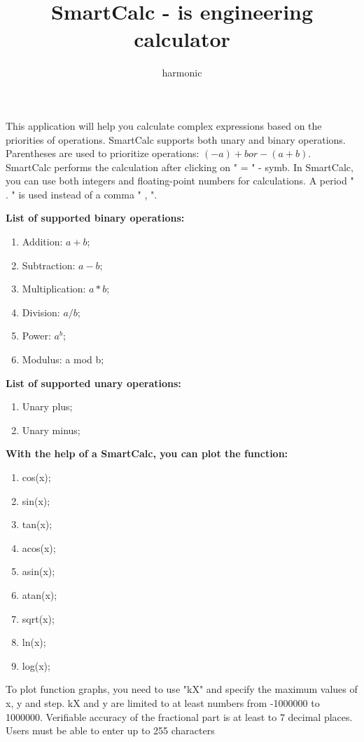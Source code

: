 \documentclass{article}
\title{SmartCalc - is engineering calculator}
\author{harmonic}
\begin{document}
\maketitle
This application will help you calculate complex expressions based on the priorities of operations.
SmartCalc supports both unary and binary operations. Parentheses are used to prioritize operations: $ ( -a ) + b  or  - ( a + b ) $.
SmartCalc performs the calculation after clicking on " = " - symb. 
In SmartCalc, you can use both integers and floating-point numbers for calculations. A period " . " is used instead of a comma " , ".

\textbf{List of supported binary operations:}
\begin{enumerate}
\item Addition: $a + b$;
\item Subtraction: $a - b$;
\item Multiplication: $a * b$;
\item Division: $a / b$;
\item Power: $a ^ b$;
\item Modulus: a mod b;
\end{enumerate}

\textbf{List of supported unary operations:}
\begin{enumerate}
\item Unary plus;
\item Unary minus;
\end{enumerate}

\textbf{With the help of a SmartCalc, you can plot the function:}
\begin{enumerate}
\item cos(x);
\item sin(x);
\item tan(x);
\item acos(x);
\item asin(x);
\item atan(x);
\item sqrt(x);
\item ln(x);
\item log(x);
\end{enumerate}

To plot function graphs, you need to use "kX" and specify the maximum values of x, y and step.
kX and y are limited to at least numbers from -1000000 to 1000000.
Verifiable accuracy of the fractional part is at least to 7 decimal places.
Users must be able to enter up to 255 characters
\end{document}
